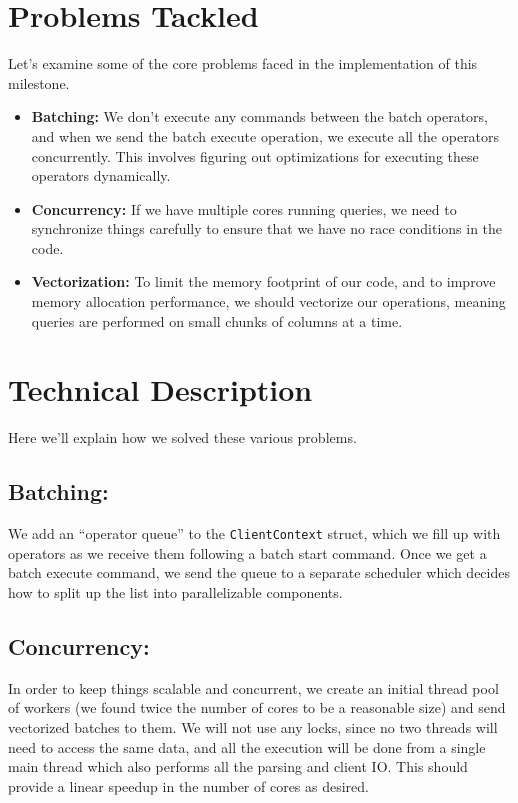 \documentclass{article}
\begin{document}
\section{Problems Tackled}

Let's examine some of the core problems faced in the implementation of this milestone.

\begin{itemize}
    \item \textbf{Batching:} We don't execute any commands between the batch operators, and when we send the batch execute operation, we execute all the operators concurrently. This involves figuring out optimizations for executing these operators dynamically.
    \item \textbf{Concurrency:} If we have multiple cores running queries, we need to synchronize things carefully to ensure that we have no race conditions in the code.
    \item \textbf{Vectorization:} To limit the memory footprint of our code, and to improve memory allocation performance, we should vectorize our operations, meaning queries are performed on small chunks of columns at a time.
\end{itemize}

\section{Technical Description}

Here we'll explain how we solved these various problems.

\subsection{Batching:}
We add an ``operator queue'' to the \texttt{ClientContext} struct, which we fill up with operators as we receive them following a batch start command. Once we get a batch execute command, we send the queue to a separate scheduler which decides how to split up the list into parallelizable components.

\subsection{Concurrency:}
In order to keep things scalable and concurrent, we create an initial thread pool of workers (we found twice the number of cores to be a reasonable size) and send vectorized batches to them. We will not use any locks, since no two threads will need to access the same data, and all the execution will be done from a single main thread which also performs all the parsing and client IO. This should provide a linear speedup in the number of cores as desired.
\end{document}
